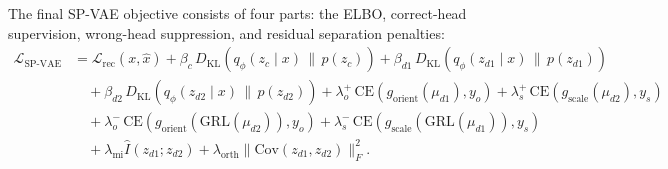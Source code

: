 The final SP-VAE objective consists of four parts: the ELBO, correct-head supervision, wrong-head suppression, and residual separation penalties:
\begin{equation}
\begin{aligned}
\mathcal{L}_{\mathrm{SP\mbox{-}VAE}}
&= \mathcal{L}_{\mathrm{rec}}(x,\hat{x})
+ \beta_c \, D_{\mathrm{KL}}\!\left(q_\phi(z_c \mid x)\,\|\,p(z_c)\right)
+ \beta_{d1} \, D_{\mathrm{KL}}\!\left(q_\phi(z_{d1} \mid x)\,\|\,p(z_{d1})\right) \\
&\quad
+ \beta_{d2} \, D_{\mathrm{KL}}\!\left(q_\phi(z_{d2} \mid x)\,\|\,p(z_{d2})\right)
+ \lambda^{+}_{o}\,\mathrm{CE}(g_{\mathrm{orient}}(\mu_{d1}), y_o)
+ \lambda^{+}_{s}\,\mathrm{CE}(g_{\mathrm{scale}}(\mu_{d2}), y_s) \\
&\quad
+ \lambda^{-}_{o}\,\mathrm{CE}(g_{\mathrm{orient}}(\mathrm{GRL}(\mu_{d2})), y_o)
+ \lambda^{-}_{s}\,\mathrm{CE}(g_{\mathrm{scale}}(\mathrm{GRL}(\mu_{d1})), y_s) \\
&\quad
+ \lambda_{\mathrm{mi}} \hat{I}(z_{d1}; z_{d2})
+ \lambda_{\mathrm{orth}} \lVert \mathrm{Cov}(z_{d1}, z_{d2}) \rVert_F^2 .
\end{aligned}
\end{equation}

